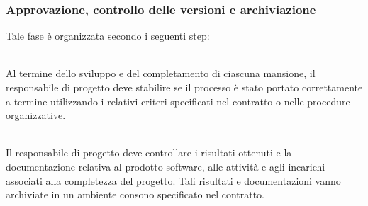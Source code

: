 \subsubsection{Approvazione, controllo delle versioni e archiviazione}
Tale fase è organizzata secondo i seguenti step:

\leavevmode \\
Al termine dello sviluppo e del completamento di ciascuna mansione, il responsabile di progetto deve stabilire se il processo è stato portato correttamente a termine utilizzando i relativi criteri specificati nel contratto o nelle procedure organizzative.

\leavevmode \\
Il responsabile di progetto deve controllare i risultati ottenuti e la documentazione relativa al prodotto software, alle attività e agli incarichi associati alla completezza del progetto. Tali risultati e documentazioni vanno archiviate in un ambiente consono specificato nel contratto.
